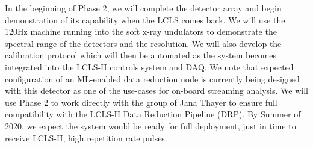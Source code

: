 In the beginning of Phase 2, we will complete the detector array and begin demonstration of its capability when the LCLS comes back.  
We will use the 120Hz machine running into the soft x-ray undulators to demonstrate the spectral range of the detectors and the resolution.  
We will also develop the calibration protocol which will then be automated as the system becomes integrated into the LCLS-II controls system and DAQ.  
We note that expected configuration of an ML-enabled data reduction node is currently being designed with this detector as one of the use-cases for on-board streaming analysis.  
We will use Phase 2 to work directly with the group of Jana Thayer to ensure full compatibility with the LCLS-II Data Reduction Pipeline (DRP).  
By Summer of 2020, we expect the system would be ready for full deployment, just in time to receive LCLS-II, high repetition rate pulses.

